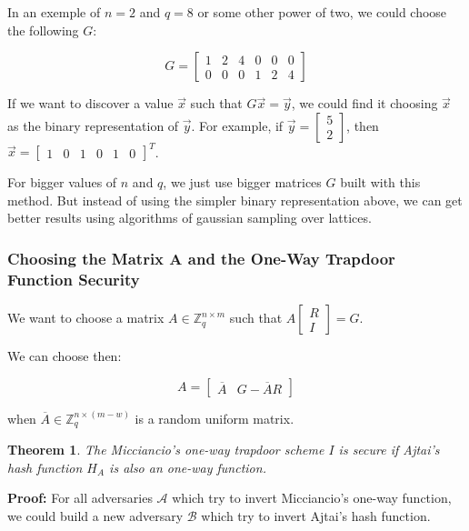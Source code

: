 \documentclass[a4paper]{article}
\newtheorem{theorem}{Theorem}
\begin{document}
 In an exemple of $n=2$ and $q=8$ or some other power of two, we could
 choose the following $G$:
 
 $$ G = \begin{bmatrix}1 & 2 & 4 & 0 & 0 & 0\\0 & 0 & 0 & 1 & 2&
   4\end{bmatrix}
 $$
 
 If we want to discover a value $\overrightarrow{x}$ such that
 $G\overrightarrow{x}=\overrightarrow{y}$, we could find it choosing
 $\overrightarrow{x}$ as the binary representation of
 $\overrightarrow{y}$. For example, if
 $\overrightarrow{y}=\begin{bmatrix}5\\2\end{bmatrix}$, then
 $\overrightarrow{x}=\begin{bmatrix}1&0&1&0&1&0\end{bmatrix}^T$.
 
 For bigger values of $n$ and $q$, we just use bigger matrices $G$
 built with this method. But instead of using the simpler binary
 representation above, we can get better results using algorithms of
 gaussian sampling over lattices.
 
 \subsubsection{Choosing the Matrix A and the One-Way Trapdoor
   Function Security}

 We want to choose a matrix $A \in \mathbb{Z}_q^{n \times m}$ such
 that $A\begin{bmatrix}R\\I\end{bmatrix} = G$.
 
 We can choose then:
 
 $$
 A = \begin{bmatrix}\overline{A} & G-\overline{A}R\end{bmatrix}
 $$
 
 when $\overline{A} \in \mathbb{Z}_q^{n \times (m-w)}$ is a random uniform matrix.
 
\begin{theorem}
 The Micciancio's one-way trapdoor scheme $I$ is secure if Ajtai's
 hash function $H_A$ is also an one-way function.
\end{theorem}
 
\textbf{Proof: }For all adversaries $\mathcal{A}$ which try to invert
Micciancio's one-way function, we could build a new adversary
$\mathcal{B}$ which try to invert Ajtai's hash function.
\end{document}
